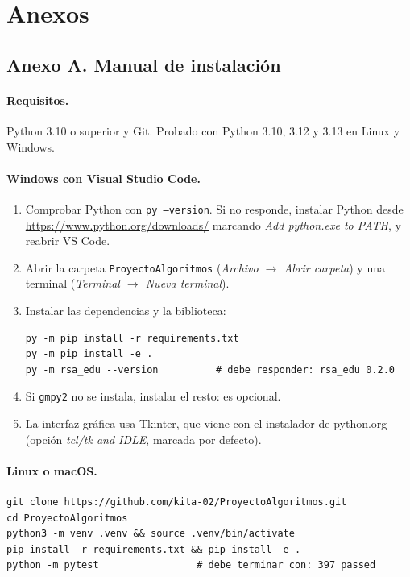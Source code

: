 \section{Anexos}
\label{sec:anexos}

\subsection{Anexo A. Manual de instalación}
\label{anx:instalacion}

\paragraph{Requisitos.} Python 3.10 o superior y Git. Probado con Python 3.10,
3.12 y 3.13 en Linux y Windows.

\paragraph{Windows con Visual Studio Code.}
\begin{enumerate}
  \item Comprobar Python con \texttt{py --version}. Si no responde, instalar Python
        desde \url{https://www.python.org/downloads/} marcando
        \emph{Add python.exe to PATH}, y reabrir VS Code.
  \item Abrir la carpeta \texttt{ProyectoAlgoritmos} (\emph{Archivo $\rightarrow$
        Abrir carpeta}) y una terminal (\emph{Terminal $\rightarrow$ Nueva terminal}).
  \item Instalar las dependencias y la biblioteca:
\begin{lstlisting}[style=datos]
py -m pip install -r requirements.txt
py -m pip install -e .
py -m rsa_edu --version          # debe responder: rsa_edu 0.2.0
\end{lstlisting}
  \item Si \texttt{gmpy2} no se instala, instalar el resto: es opcional.
  \item La interfaz gráfica usa Tkinter, que viene con el instalador de
        python.org (opción \emph{tcl/tk and IDLE}, marcada por defecto).
\end{enumerate}

\paragraph{Linux o macOS.}\mbox{}
\begin{lstlisting}[style=datos]
git clone https://github.com/kita-02/ProyectoAlgoritmos.git
cd ProyectoAlgoritmos
python3 -m venv .venv && source .venv/bin/activate
pip install -r requirements.txt && pip install -e .
python -m pytest                 # debe terminar con: 397 passed
\end{lstlisting}

